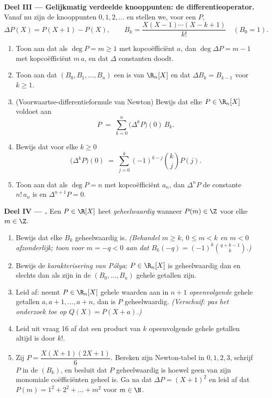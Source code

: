 \begin{problem}
\medskip
\noindent\textbf{Deel III --- Gelijkmatig verdeelde knooppunten:
de differentieoperator.} Vanaf nu zijn de knooppunten $0, 1, 2,
\dots$ en stellen we, voor een  $P$,
\[
\Delta P(X) = P(X + 1) - P(X),
\qquad
B_k = \frac{X(X-1)\cdots(X-k+1)}{k!} \quad (B_0 = 1).
\]
\begin{enumerate}[resume]
  \item Toon aan dat als $\deg P = m \geq 1$ met kopcoëfficiënt
        $a$, dan $\deg \Delta P = m - 1$ met kopcoëfficiënt
        $m\,a$, en dat $\Delta$ constanten doodt.
  \item Toon aan dat $(B_0, B_1, \dots, B_n)$ een  is van
        $\R_n[X]$ en dat $\Delta B_k = B_{k-1}$ voor $k \geq 1$.
  \item (Voorwaartse-differentieformule van Newton) Bewijs dat elke
        $P \in \R_n[X]$ voldoet aan
        \[
        P \;=\; \sum_{k=0}^{n} \bigl(\Delta^{k} P\bigr)(0)\, B_k .
        \]
  \item Bewijs dat voor elke $k \geq 0$
        \[
        \bigl(\Delta^{k} P\bigr)(0) \;=\;
        \sum_{j=0}^{k} (-1)^{k-j} \binom{k}{j} P(j) .
        \]
  \item Toon aan dat als $\deg P = n$ met kopcoëfficiënt $a_n$, dan
        $\Delta^{n} P$ de constante $n!\,a_n$ is en $\Delta^{n+1} P
        = 0$.
\end{enumerate}

\medskip
\noindent\textbf{Deel IV --- .} Een
 $P \in \R[X]$ heet \emph{geheelwaardig} wanneer $P(m) \in
\Z$ voor elke $m \in \Z$.
\begin{enumerate}[resume]
  \item Bewijs dat elke $B_k$ geheelwaardig is. \emph{(Behandel $m
        \geq k$, $0 \leq m < k$ en $m < 0$ afzonderlijk; toon voor
        $m = -q < 0$ aan dat $B_k(-q) = (-1)^k \binom{q + k -
        1}{k}$.)}
  \item Bewijs de \emph{karakterisering van Pólya}: $P \in \R_n[X]$
        is geheelwaardig dan en slechts dan als zijn  in
        de  $(B_0, \dots, B_n)$ gehele getallen zijn.
  \item Leid af: neemt $P \in \R_n[X]$ gehele waarden aan in $n +
        1$ \emph{opeenvolgende} gehele getallen $a, a+1, \dots,
        a+n$, dan is $P$ geheelwaardig. \emph{(Verschuif: pas het
        onderzoek toe op $Q(X) = P(X + a)$.)}
  \item Leid uit vraag 16 af dat een product van $k$ opeenvolgende
        gehele getallen altijd  is door $k!$.
  \item Zij $P = \dfrac{X(X+1)(2X+1)}{6}$. Bereken zijn
        Newton-tabel in $0, 1, 2, 3$, schrijf $P$ in de 
        $(B_k)$, en besluit dat $P$ geheelwaardig is hoewel geen
        van zijn monomiale coëfficiënten geheel is. Ga na dat
        $\Delta P = (X+1)^2$ en leid af dat $P(m) = 1^2 + 2^2 +
        \dots + m^2$ voor $m \in \N$.
\end{enumerate}


\end{problem}
